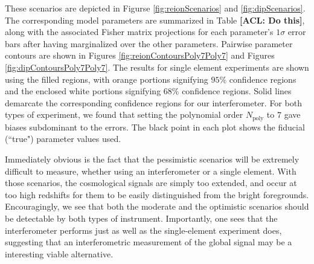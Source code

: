 \documentclass[twolcolumn,apj,iop,numberedappendix]{emulateapj}
\newcommand{\acl}[1]{{\color{red} \textbf{[ACL:  #1]}}}
\begin{document}
These scenarios are depicted in Figurse \ref{fig:reionScenarios} and  \ref{fig:dipScenarios}. The corresponding model parameters are summarized in Table \acl{Do this}, along with the associated Fisher matrix projections for each parameter's $1\sigma$ error bars after having marginalized over the other parameters. Pairwise parameter contours are shown in Figures \ref{fig:reionContoursPoly7Poly7} and Figures \ref{fig:dipContoursPoly7Poly7}. The results for single element experiments are shown using the filled regions, with orange portions signifying $95\%$ confidence regions and the enclosed white portions signifying $68\%$ confidence regions. Solid lines demarcate the corresponding confidence regions for our interferometer. For both types of experiment, we found that setting the polynomial order $N_\textrm{poly}$ to $7$ gave biases subdominant to the errors. The black point in each plot shows the fiducial (``true") parameter values used.

Immediately obvious is the fact that the pessimistic scenarios will be extremely difficult to measure, whether using an interferometer or a single element. 
With those scenarios, the cosmological signals are simply too extended, and occur at too high redshifts for them to be easily distinguished from the bright foregrounds. Encouragingly, we see that both the moderate and the optimistic scenarios should be detectable by both types of instrument. Importantly, one sees that the interferometer performs just as well as the single-element experiment does, suggesting that an interferometric measurement of the global signal may be a interesting viable alternative.
\end{document}
